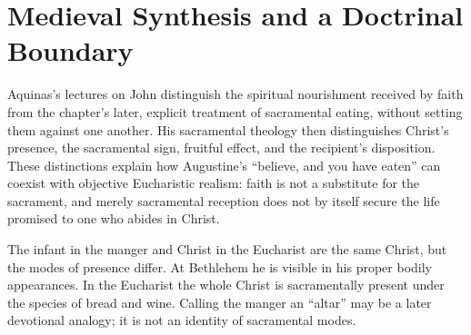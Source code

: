 \section{Medieval Synthesis and a Doctrinal Boundary}

Aquinas's lectures on John distinguish the spiritual nourishment received by
faith from the chapter's later, explicit treatment of sacramental eating,
without setting them against one another. His sacramental theology then
distinguishes Christ's presence, the sacramental sign, fruitful effect, and the
recipient's disposition. These distinctions explain how Augustine's
``believe, and you have eaten'' can coexist with objective Eucharistic realism:
faith is not a substitute for the sacrament, and merely sacramental reception
does not by itself secure the life promised to one who abides in Christ.

The infant in the manger and Christ in the Eucharist are the same Christ, but
the modes of presence differ. At Bethlehem he is visible in his proper bodily
appearances. In the Eucharist the whole Christ is sacramentally present under
the species of bread and wine. Calling the manger an ``altar'' may be a later
devotional analogy; it is not an identity of sacramental modes.

